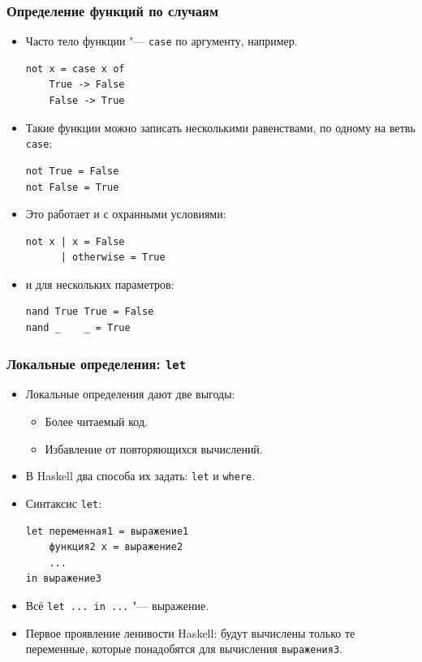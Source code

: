 \documentclass[10pt]{beamer}
\begin{document}
\begin{frame}[fragile]
\frametitle{Определение функций по случаям}
\begin{itemize}
    \item Часто тело функции "--- \lstinline|case| по аргументу, например.
\begin{lstlisting}[basicstyle=\ttfamily\small]
not x = case x of
    True -> False
    False -> True
\end{lstlisting}
\item Такие функции можно записать несколькими равенствами, по одному на ветвь \lstinline|case|:
\begin{lstlisting}[basicstyle=\ttfamily\small]
not True = False
not False = True
\end{lstlisting}
\item Это работает и с охранными условиями:
\begin{lstlisting}[basicstyle=\ttfamily\small]
not x | x = False
      | otherwise = True
\end{lstlisting}
\item и для нескольких параметров:
\begin{lstlisting}[basicstyle=\ttfamily\small]
nand True True = False
nand _    _ = True
\end{lstlisting}
\end{itemize}
\end{frame}

\begin{frame}[fragile]
\frametitle{Локальные определения: \lstinline[basicstyle=\ttfamily]|let|}
\begin{itemize}
    \item Локальные определения дают две выгоды:
    \begin{itemize}
        \item Более читаемый код.
        \item Избавление от повторяющихся вычислений.
    \end{itemize}
    \item В Haskell два способа их задать: \lstinline|let| и \lstinline|where|.
    \item Синтаксис \lstinline|let|:
\begin{lstlisting}
let переменная1 = выражение1
    функция2 x = выражение2
    ...
in выражение3
\end{lstlisting}
    \item Всё \lstinline|let ... in ...| "--- выражение.
    \item Первое проявление ленивости Haskell: будут вычислены только те переменные, которые понадобятся для вычисления \lstinline|выражения3|.
\end{itemize}
\end{frame}
\end{document}
